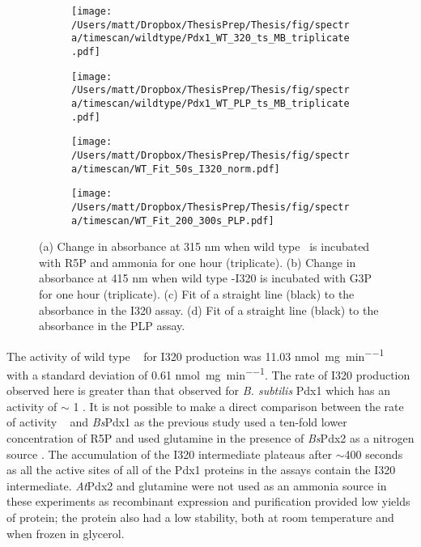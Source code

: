 \begin{figure}[!htbp]
\centering
\begin{subfigure}{.5\textwidth}
  \centering
  \texttt{[image: /Users/matt/Dropbox/ThesisPrep/Thesis/fig/spectra/timescan/wildtype/Pdx1\_WT\_320\_ts\_MB\_triplicate.pdf]}
  \caption{}
  \label{fig:pdx1_WT_ts_320}
\end{subfigure}%
\begin{subfigure}{.5\textwidth}
  \centering
  \texttt{[image: /Users/matt/Dropbox/ThesisPrep/Thesis/fig/spectra/timescan/wildtype/Pdx1\_WT\_PLP\_ts\_MB\_triplicate.pdf]}
  \caption{}
  \label{fig:pdx1_WT_ts_PLP}
\end{subfigure}
\begin{subfigure}{.5\textwidth}
  \centering
  \texttt{[image: /Users/matt/Dropbox/ThesisPrep/Thesis/fig/spectra/timescan/WT\_Fit\_50s\_I320\_norm.pdf]}
  \caption{}
  \label{fig:pdx1_WT_ts_320_fit}
\end{subfigure}%
\begin{subfigure}{.5\textwidth}
  \centering
  \texttt{[image: /Users/matt/Dropbox/ThesisPrep/Thesis/fig/spectra/timescan/WT\_Fit\_200\_300s\_PLP.pdf]}
  \caption{}
  \label{fig:pdx1_WT_ts_PLP_fit}
\end{subfigure}
\caption[\textit{In vitro} assays of wild type \atpdx~ activity]{(a) Change in absorbance at 315 nm when wild type \atpdx ~is incubated with R5P and ammonia for one hour (triplicate). (b) Change in absorbance at 415 nm when wild type \atpdx -I320 is incubated with G3P for one hour (triplicate). (c) Fit of a straight line (black) to the absorbance in the I320 assay. (d) Fit of a straight line (black) to the absorbance in the PLP assay.}
\end{figure}

The activity of wild type \atpdx~ for I320 production was 11.03 \si{\nano\mole\per\milli\gram\per\minute}~ with a standard deviation of 0.61 \si{\nano\mole\per\milli\gram\per\minute}. The rate of I320 production observed here is greater than that observed for \textit{B. subtilis} Pdx1 which has an activity of $\sim$ 1 \act \cite{Raschle2007}. It is not possible to make a direct comparison between the rate of activity \atpdx~ and \textit{Bs}Pdx1 as the previous study used a ten-fold lower concentration of R5P and used glutamine in the presence of \textit{Bs}Pdx2 as a nitrogen source \cite{Raschle2007}. The accumulation of the I320 intermediate plateaus after $\sim$400 seconds as all the active sites of all of the Pdx1 proteins in the assays contain the I320 intermediate. \textit{At}Pdx2 and glutamine were not used as an ammonia source in these experiments as recombinant expression and purification provided low yields of protein; the protein also had a low stability, both at room temperature and when frozen in glycerol. 

